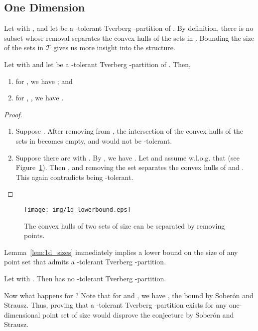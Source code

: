 \documentclass[oribibl,envcountsame,envcountsect]{llncs}
\newcommand{\mc}[1]{\ensuremath{\mathcal{#1}}}
\newcommand{\Soberon}{Sober\'{o}n}
\begin{document}
\subsection{One Dimension}
Let  with , and let
 be a -tolerant Tverberg -partition of . By
definition, there is no
subset  whose removal separates the convex hulls of the
sets in . Bounding the size of the sets in \mc{T} gives us more insight
into the structure.

\begin{lemma}\label{lem:1d_sizes}
  Let  with  and let  be
  a -tolerant Tverberg -partition of . Then,
  \begin{enumerate}
    \renewcommand{\labelenumi}{(\roman{enumi})}
    \item for , we have ; and
    \item for , , we have .
  \end{enumerate}
\end{lemma}
\begin{proof}
  \begin{enumerate}
    \renewcommand{\labelenumi}{(\roman{enumi})}
    \item Suppose . After removing  from , the
          intersection of the convex hulls of the sets in  becomes empty,
          and  would not be -tolerant.
    \item Suppose there are   with . By , we have .
    Let  and assume w.l.o.g. that 
    (see Figure~\ref{fig:1d_sizes}).
    Then , and removing the set  separates the convex hulls of  and .
    This again contradicts   being -tolerant.
  \end{enumerate}
\end{proof}

\begin{figure}[htbp]
  \begin{center}
    \texttt{[image: img/1d\_lowerbound.eps]}
  \end{center}
  \caption{The convex hulls of two sets of size  can be separated by
    removing  points.}
  \label{fig:1d_sizes}
\end{figure}

Lemma~\ref{lem:1d_sizes} immediately implies a lower bound on the size of any point set
that admits a -tolerant Tverberg -partition.

\begin{corollary}
  \label{ld:cor:lb}
  Let  with . Then  has no -tolerant
  Tverberg -partition.
\end{corollary}

Now what happens for ? Note that for  and , we
have , the bound by \Soberon{} and Strausz.
Thus, proving that a -tolerant Tverberg -partition exists for any
one-dimensional point set of size  would disprove the conjecture by
\Soberon{} and Strausz.
\end{document}
